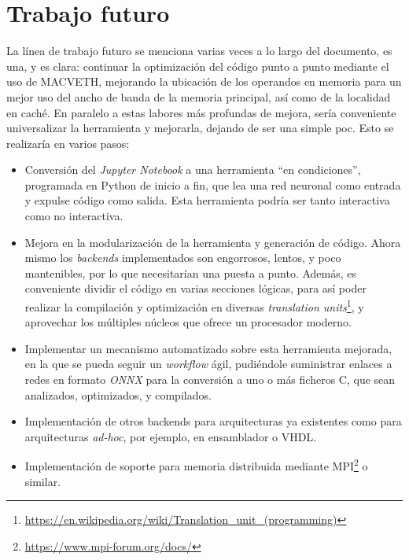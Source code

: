 \section{Trabajo futuro}
La línea de trabajo futuro se menciona varias veces a lo largo del documento, es una, y es clara: continuar la optimización del código punto a punto mediante el uso de MACVETH, mejorando la ubicación de los operandos en memoria para un mejor uso del ancho de banda de la memoria principal, así como de la localidad en caché. En paralelo a estas labores más profundas de mejora, sería conveniente universalizar la herramienta y mejorarla, dejando de ser una simple \acrshort{poc}. Esto se realizaría en varios pasos: 
\begin{itemize}
    \item Conversión del \textit{Jupyter Notebook} a una herramienta ``en condiciones'', programada en Python de inicio a fin, que lea una red neuronal como entrada y expulse código como salida. Esta herramienta podría ser tanto interactiva como no interactiva.
    \item Mejora en la modularización de la herramienta y generación de código. Ahora mismo los \textit{\gls{backend}s} implementados son engorrosos, lentos, y poco mantenibles, por lo que necesitarían una puesta a punto. Además, es conveniente dividir el código en varias secciones lógicas, para así poder realizar la compilación y optimización en diversas \textit{translation units}\footnote{\url{https://en.wikipedia.org/wiki/Translation_unit_(programming)}}, y aprovechar los múltiples núcleos que ofrece un procesador moderno.
    \item Implementar un mecanismo automatizado sobre esta herramienta mejorada, en la que se pueda seguir un \textit{workflow} ágil, pudiéndole suministrar enlaces a redes en formato \textit{ONNX} para la conversión a uno o más ficheros C, que sean analizados, optimizados, y compilados.
    \item Implementación de otros backends para arquitecturas ya existentes como para arquitecturas \textit{ad-hoc}, por ejemplo, en ensamblador o VHDL.
    \item Implementación de soporte para memoria distribuida mediante MPI\footnote{\url{https://www.mpi-forum.org/docs/}} o similar.
\end{itemize}
